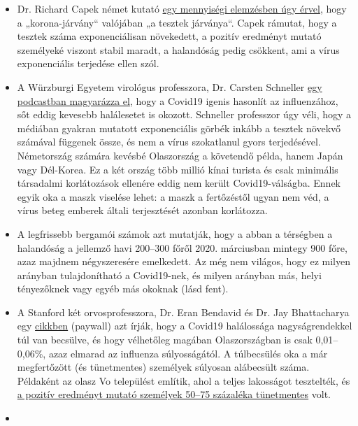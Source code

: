 \begin{itemize}
\tightlist
\item
  Dr. Richard Capek német kutató
  \href{https://coronadaten.wordpress.com/}{egy mennyiségi elemzésben
  úgy érvel}, hogy a „korona-járvány`` valójában „a tesztek járványa``.
  Capek rámutat, hogy a tesztek száma exponenciálisan növekedett, a
  pozitív eredményt mutató személyeké viszont stabil maradt, a
  halandóság pedig csökkent, ami a vírus exponenciális terjedése ellen
  szól.
\item
  A Würzburgi Egyetem virológus professzora, Dr. Carsten Schneller
  \href{https://www.youtube.com/watch?v=w-uub0urNfw}{egy podcastban
  magyarázza el}, hogy a Covid19 igenis hasonlít az influenzához, sőt
  eddig kevesebb halálesetet is okozott. Schneller professzor úgy véli,
  hogy a médiában gyakran mutatott exponenciális görbék inkább a tesztek
  növekvő számával függenek össze, és nem a vírus szokatlanul gyors
  terjedésével. Németország számára kevésbé Olaszország a követendő
  példa, hanem Japán vagy Dél-Korea. Ez a két ország több millió kínai
  turista és csak minimális társadalmi korlátozások ellenére eddig nem
  került Covid19-válságba. Ennek egyik oka a maszk viselése lehet: a
  maszk a fertőzéstől ugyan nem véd, a vírus beteg emberek általi
  terjesztését azonban korlátozza.
\item
  A legfrissebb bergamói számok azt mutatják, hogy a abban a térségben a
  halandóság a jellemző havi 200--300 főről 2020. márciusban mintegy 900
  főre, azaz majdnem négyszeresére emelkedett. Az még nem világos, hogy
  ez milyen arányban tulajdonítható a Covid19-nek, és milyen arányban
  más, helyi tényezőknek vagy egyéb más okoknak (lásd fent).
\item
  A Stanford két orvosprofesszora, Dr. Eran Bendavid és Dr. Jay
  Bhattacharya egy
  \href{https://www.wsj.com/articles/is-the-coronavirus-as-deadly-as-they-say-11585088464}{cikkben}
  (paywall) azt írják, hogy a Covid19 halálossága nagyságrendekkel túl
  van becsülve, és hogy vélhetőleg magában Olaszországban is csak
  0,01--0,06\%, azaz elmarad az influenza súlyosságától. A túlbecsülés
  oka a már megfertőzött (és tünetmentes) személyek súlyosan alábecsült
  száma. Példaként az olasz Vo települést említik, ahol a teljes
  lakosságot tesztelték, és
  \href{https://www.repubblica.it/salute/medicina-e-ricerca/2020/03/16/news/coronavirus_studio_il_50-75_dei_casi_a_vo_sono_asintomatici_e_molto_contagiosi-251474302/}{a
  pozitív eredményt mutató személyek 50--75 százaléka tünetmentes} volt.
\item

\end{itemize}
